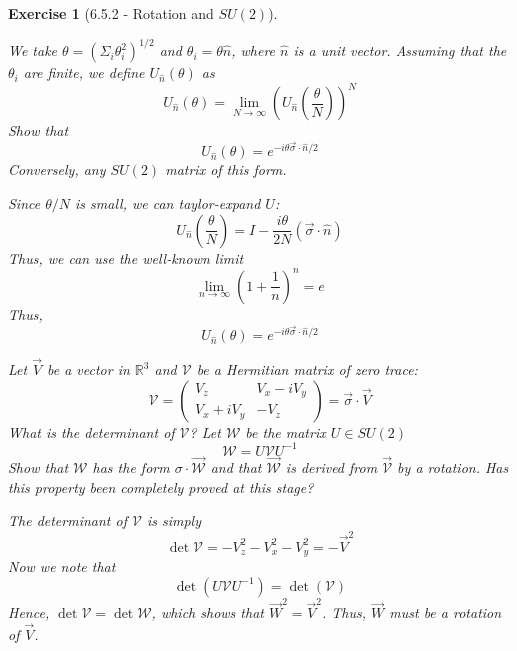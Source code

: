 \documentclass[12pt]{article}
\def\be{\begin{equation}}
\def\ee{\end{equation}}
\def\f{\frac}
\def\l{\left}
\def\r{\right}
\newtheorem{exercise}{Exercise}
\begin{document}
\begin{exercise}[6.5.2 - Rotation and $SU(2)$]
\begin{exercises}
			\item We take $\theta=(\Sigma_i\theta_i^2)^{1/2}$ and $\theta_i=\theta\hat{n}$, where $\hat{n}$ is a unit vector. Assuming that the $\theta_i$ are finite, we define $U_{\hat{n}}(\theta)$ as 
			\be
				U_{\hat{n}}(\theta) = \lim_{N\to\infty} \l( U_{\hat{n}}\l(\f{\theta}{N}\r)\r)^N
			\ee
			Show that
			\be
				U_{\hat{n}}(\theta) = e^{-i\theta \vec{\sigma}\cdot\hat{n}/2}
			\ee
			Conversely, any $SU(2)$ matrix of this form. 
			\begin{multianswer}
				Since $\theta/N$ is small, we can taylor-expand $U$:
				\be
					U_{\hat{n}}\l(\f{\theta}{N}\r) = I - \f{i\theta}{2N}(\vec{\sigma}\cdot\hat{n})
				\ee
				Thus, we can use the well-known limit
				\be
					\lim_{n\to\infty}\l(1 + \f{1}{n} \r)^n = e
				\ee
				Thus,
				\be
					U_{\hat{n}}(\theta) = e^{-i\theta \vec{\sigma}\cdot\hat{n}/2}
				\ee				
			\end{multianswer}
			
			\item Let $\vec{V}$ be a vector in $\mathbb{R}^3$ and $\mathcal{V}$ be a Hermitian matrix of zero trace:
			\be
				\mathcal{V} = 
				\begin{pmatrix}
					V_z & V_x - iV_y \\
					V_x + iV_y & -V_z
				\end{pmatrix} 
				= \vec{\sigma}\cdot\vec{V}
			\ee
			What is the determinant of $\mathcal{V}$? Let $\mathcal{W}$ be the matrix $U \in SU(2)$
			\be
				\mathcal{W} = U\mathcal{V}U^{-1}
			\ee
			Show that $\mathcal{W}$ has the form $\sigma\cdot\vec{\mathcal{W}}$ and that $\vec{\mathcal{W}}$ is derived from $\vec{\mathcal{V}}$ by a rotation. Has this property been completely proved at this stage? 
			\begin{multianswer}
				The determinant of $\mathcal{V}$ is simply
				\be
					\det\mathcal{V} = -V_z^2 - V_x^2 - V_y^2 = -\vec{V}^2
				\ee
				Now we note that 
				\be
					\det(U\mathcal{V}U^{-1}) = \det(\mathcal{V})
				\ee
				Hence, $\det\mathcal{V} = \det\mathcal{W}$, which shows that $\vec{W}^2 = \vec{V}^2$. Thus, $\vec{W}$ must be a rotation of $\vec{V}$. 
				
			\end{multianswer}
			

\end{exercises}
\end{exercise}
\end{document}
